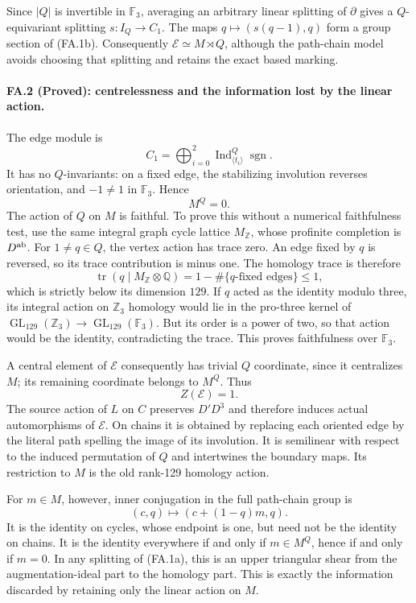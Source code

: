 Since $|Q|$ is invertible in $\mathbb F_3$, averaging
an arbitrary linear splitting of $\partial$ gives
a $Q$-equivariant splitting $s:I_Q\to C_1$.
The maps $q\mapsto(s(q-1),q)$ form a group section
of (FA.1b). Consequently $\mathcal E\simeq M\rtimes Q$,
although the path-chain model avoids choosing that
splitting and retains the exact based marking.

\paragraph{FA.2 (Proved): centrelessness and the information lost by the linear action.}
The edge module is
\[
 C_1=\bigoplus_{i=0}^2
       \operatorname{Ind}_{\langle t_i\rangle}^{Q}
                      \operatorname{sgn}.
\]
It has no $Q$-invariants: on a fixed edge, the
stabilizing involution reverses orientation, and
$-1\ne1$ in $\mathbb F_3$. Hence
\[
                              M^Q=0.
 \tag{FA.2a}
\]
The action of $Q$ on $M$ is faithful. To prove this
without a numerical faithfulness test, use the same
integral graph cycle lattice $M_{\mathbb Z}$, whose
profinite completion is $D^{\rm ab}$. For $1\ne q\in Q$, the
vertex action has trace zero. An edge fixed by $q$
is reversed, so its trace contribution is minus one.
The homology trace is therefore
\[
          \operatorname{tr}(q\mid M_{\mathbb Z}\otimes\mathbb Q)
                       =1-\#\{q\text{-fixed edges}\}\leq1,
\]
which is strictly below its dimension $129$.
If $q$ acted as the identity modulo three, its
integral action on $\mathbb Z_3$ homology would lie
in the pro-three kernel of
$\operatorname{GL}_{129}(\mathbb Z_3)\to
\operatorname{GL}_{129}(\mathbb F_3)$. But its order
is a power of two, so that action would be the
identity, contradicting the trace. This proves
faithfulness over $\mathbb F_3$.

A central element of $\mathcal E$ consequently
has trivial $Q$ coordinate, since it centralizes
$M$; its remaining coordinate belongs to $M^Q$.
Thus
\[
                         Z(\mathcal E)=1.
 \tag{FA.2b}
\]
The source action of $L$ on $C$ preserves $D'D^3$
and therefore induces actual automorphisms of
$\mathcal E$. On chains it is obtained by replacing
each oriented edge by the literal path spelling
the image of its involution. It is semilinear
with respect to the induced permutation of $Q$
and intertwines the boundary maps. Its restriction
to $M$ is the old rank-129 homology action.

For $m\in M$, however, inner conjugation in the
full path-chain group is
\[
       (c,q)\longmapsto(c+(1-q)m,q).
 \tag{FA.2c}
\]
It is the identity on cycles, whose endpoint is
one, but need not be the identity on chains.
It is the identity everywhere if and only if
$m\in M^Q$, hence if and only if $m=0$.
In any splitting of (FA.1a), this is an upper
triangular shear from the augmentation-ideal
part to the homology part. This is exactly
the information discarded by retaining only
the linear action on $M$.

